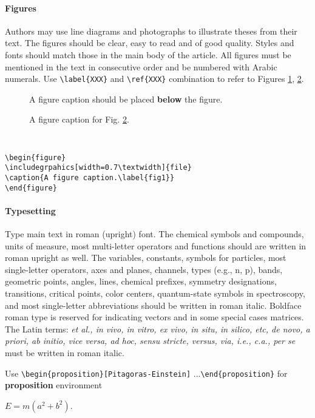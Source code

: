 \documentclass{lpaper} %
\begin{document}
\paragraph{Figures}
    Authors may use line diagrams and photographs to illustrate theses from their text. The figures should be clear, easy to read and of good quality. Styles and fonts should match those in the main body of the article. All figures must be mentioned in the text in consecutive order and be numbered with Arabic numerals. Use {\tt \verb+\label{XXX}+} and {\tt \verb+\ref{XXX}+} combination to refer to Figures \ref{fig1}, \ref{fig2}.

\begin{figure}
\caption{A figure caption should be placed {\bfseries below} the figure.\label{fig1}}
\end{figure}

\begin{figure}
\caption{A figure caption for Fig. \ref{fig2}.\label{fig2}}
\end{figure}

{\tt
\begin{verbatim}
\begin{figure}
\includegrpahics[width=0.7\textwidth]{file}
\caption{A figure caption.\label{fig1}}
\end{figure}
\end{verbatim}
}

\paragraph{Typesetting}
    Type main text in roman (upright) font. The chemical symbols and compounds, units of measure, most multi-letter operators and functions should are written in roman upright as well. The variables, constants, symbols for particles, most single-letter operators, axes and planes, channels, types (e.g., n, p), bands, geometric points, angles, lines, chemical prefixes, symmetry designations, transitions, critical points, color centers, quantum-state symbols in spectroscopy, and most single-letter abbreviations should be written in roman italic. Boldface roman type is reserved for indicating vectors and in some special cases matrices. The Latin terms:
{\em
et al.,
in vivo,
in vitro,
ex vivo,
in situ,
in silico,
etc,
de novo,
a priori,
ab initio,
vice versa,
ad hoc,
sensu stricte,
versus,
via,
i.e.,
c.a.,
per se}
must be written in roman italic.

Use {\tt \verb+\begin{proposition}[Pitagoras-Einstein]+} ...{\tt \verb+\end{proposition}+} for {\bfseries proposition} environment
\begin{proposition}
$E=m(a^2+b^2)$.
\end{proposition}
\end{document}
